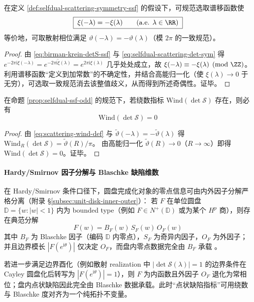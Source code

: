 \begin{proposition}[谱移奇偶性强制]\label{prop:selfdual-ssf-odd}
在定义 \ref{def:selfdual-scattering-symmetry-ssf} 的假设下，可规范选取谱移函数使
\[
\boxed{\;\xi(-\lambda)=-\xi(\lambda)\qquad(\text{a.e. }\lambda\in\RR)\;}
\]
等价地，可取散射相位满足 \(\vartheta(-\lambda)=-\vartheta(\lambda)\)（模 \(2\pi\) 的一致规范）。
\end{proposition}

\begin{proof}
由 \eqref{eq:birman-krein-detS-ssf} 与 \eqref{eq:selfdual-scattering-det-sym} 得
\(
e^{-2\pi\mathrm{i}\xi(-\lambda)}=\overline{e^{-2\pi\mathrm{i}\xi(\lambda)}}=e^{2\pi\mathrm{i}\xi(\lambda)}
\)
几乎处处成立，故 \(\xi(-\lambda)\equiv-\xi(\lambda)\pmod{\ZZ}\)。
利用谱移函数“定义到加常数”的不确定性，并结合高能归一化（使 \(\xi(\lambda)\to 0\) 于无穷），可选取一致规范消去该整值歧义，从而得到所述奇偶性。证毕。
\end{proof}

\begin{proposition}\label{prop:selfdual-wind-vanish}
在命题 \ref{prop:selfdual-ssf-odd} 的规范下，若绕数指标 \(\mathrm{Wind}(\det\mathcal S)\) 存在，则必有
\[
\boxed{\;\mathrm{Wind}(\det\mathcal S)=0\;}
\]
\end{proposition}

\begin{proof}
由 \eqref{eq:scattering-wind-def} 与 \(\widetilde\vartheta(-\lambda)=-\widetilde\vartheta(\lambda)\) 得 \(\mathrm{Wind}_R(\det\mathcal S)=\widetilde\vartheta(R)/\pi\)。
由高能归一化 \(\widetilde\vartheta(R)\to 0\)（\(R\to\infty\)）即得 \(\mathrm{Wind}(\det\mathcal S)=0\)。证毕。
\end{proof}

\paragraph{Hardy/Smirnov 因子分解与 Blaschke 缺陷维数}
在 Hardy/Smirnov 条件口径下，圆盘完成化对象的零点信息可由内外因子分解严格分离（附录 \S\ref{subsec:unit-disk-inner-outer}）：
若 \(F\) 在单位圆盘 \(\mathbb{D}=\{w:|w|<1\}\) 内为 bounded type（例如 \(F\in N^+(\mathbb{D})\) 或为某个 \(H^p\) 商），则存在典范分解
\[
\boxed{\;F(w)=B_F(w)\,S_F(w)\,O_F(w)\;}
\]
其中 \(B_F\) 为 Blaschke 因子（编码 \(\mathbb{D}\) 内零点），\(S_F\) 为奇异内因子，\(O_F\) 为外因子；并且边界模长 \(|F(e^{\mathrm{i}\theta})|\) 仅决定 \(O_F\)，而盘内零点数据完全由 \(B_F\) 承载 \cite{Duren1970TheoryHp,Garnett2007BoundedAnalyticFunctions}。
\par
若进一步满足边界酉化（例如散射 realization 中 \(|\det\mathcal S(\lambda)|=1\) 的边界条件在 Cayley 圆盘化后转写为 \(|F(e^{\mathrm{i}\theta})|=1\)），则 \(F\) 为内函数且外因子 \(O_F\) 退化为常相位；盘内点状缺陷因此完全由 Blaschke 数据承载。此时“点状缺陷指标”可用绕数与 Blaschke 度对齐为一个纯拓扑不变量。


